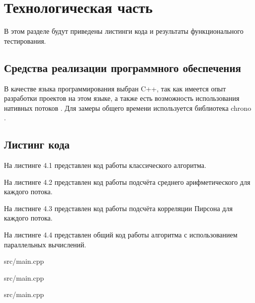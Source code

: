\chapter{Технологическая часть}
В этом разделе будут приведены листинги кода и результаты функционального тестирования.

\section{Средства реализации программного обеспечения}
В качестве языка программирования выбран C++, так как имеется опыт разработки проектов на этом языке, 
а также есть возможность использования нативных потоков \cite{thread}.
Для замеры общего времени используется библиотека chrono \cite{time}.

\section{Листинг кода}
\FloatBarrier
На листинге 4.1 представлен код работы классического алгоритма.

На листинге 4.2 представлен код работы подсчёта среднего арифметического для каждого потока.

На листинге 4.3 представлен код работы подсчёта корреляции Пирсона для каждого потока.

На листинге 4.4 представлен общий код работы алгоритма с использованием параллельных вычислений.

\begin{lstinputlisting}[language=C++, caption=Реализация классического алгоритма, linerange={14-54}, 
	basicstyle=\footnotesize\ttfamily, frame=single,breaklines=true]{src/main.cpp}
\end{lstinputlisting}
\FloatBarrier

\FloatBarrier
\begin{lstinputlisting}[language=C++, caption=Реализация схемы подсчёта среднего арифметического для каждого потока, 
	linerange={63-73}, basicstyle=\footnotesize\ttfamily, frame=single,breaklines=true]{src/main.cpp}
\end{lstinputlisting}
\FloatBarrier

\FloatBarrier
\begin{lstinputlisting}[language=C++, caption=Реализация схемы подсчёта корреляции Пирсона, linerange={89-123}, 
	basicstyle=\footnotesize\ttfamily, frame=single, breaklines=true]{src/main.cpp}
\end{lstinputlisting}
\FloatBarrier

